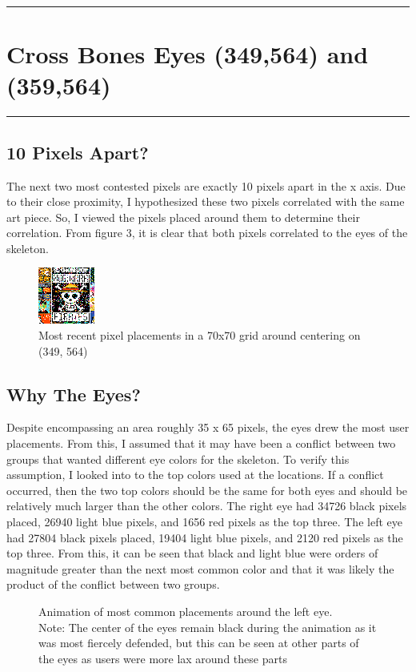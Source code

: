 {\color{gray}\hrule}
\section{Cross Bones Eyes (349,564) and (359,564)}
{\color{gray}\hrule}

\subsection{10 Pixels Apart?}

The next two most contested pixels are exactly 10 pixels apart in the x axis. Due to their close proximity, I hypothesized these two pixels correlated with the same art piece. So, I viewed the pixels placed around them to determine their correlation. From figure 3, it is clear that both pixels correlated to the eyes of the skeleton. 

\begin{figure}[H]
\centering
\includegraphics{visuals/349_564_35_80_mode_1}
    \caption{Most recent pixel placements in a 70x70 grid around centering on (349, 564) }
\end{figure}

\subsection{Why The Eyes?}

Despite encompassing an area roughly 35 x 65 pixels, the eyes drew the most user placements. From this, I assumed that it may have been a conflict between two groups that wanted different eye colors for the skeleton. To verify this assumption, I looked into to the top colors used at the locations. If a conflict occurred, then the two top colors should be the same for both eyes and should be relatively much larger than the other colors. 
 The right eye had 34726 black pixels placed, 26940 light blue pixels, and 1656 red pixels as the top three. The left eye had 27804 black pixels placed, 19404 light blue pixels, and 2120 red pixels as the top three. From this, it can be seen that black and light blue were orders of magnitude greater than the next most common color and that it was likely the product of the conflict between two groups.

\begin{figure}[H]
\centering
{}
    \caption{Animation of most common placements around the left eye. \\ Note: The center of the eyes remain black during the animation as it was most fiercely defended, but this can be seen at other parts of the eyes as users were more lax around these parts}
\end{figure}


